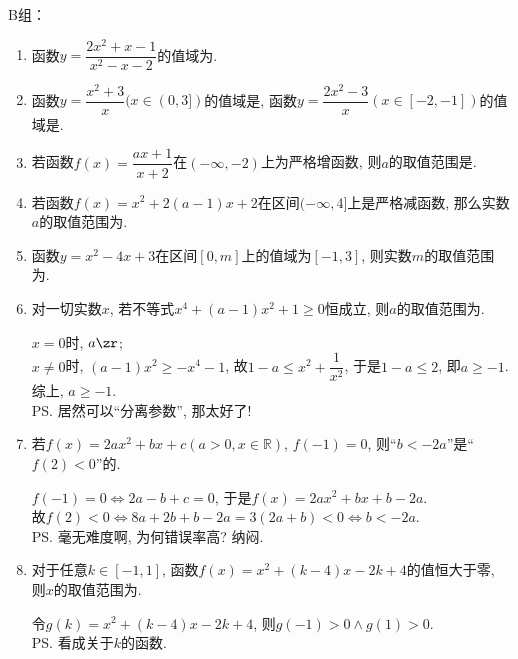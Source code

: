B组：
\begin{enumerate}
\item 函数$y=\dfrac{2x^2+x-1}{x^2-x-2}$的值域为. 

\item 函数$y=\dfrac{x^2+3}{x}(x\in (0,3] )$的值域是\blkda[1.8]{$[2\sqrt{3},+\infty)$}, 
函数$y=\dfrac{2x^2-3}{x}(x\in [-2, -1])$的值域是\blkda{$[-\frac{5}{2},1]$}. 

\item 若函数$f(x)=\dfrac{ax+1}{x+2}$在$(-\infty,-2)$上为严格增函数, 则$a$的取值范围是. 

\item 若函数$f(x)=x^2+2(a-1)x+2$在区间$(-\infty,4]$上是严格减函数, 那么实数$a$的取值范围为. 

\item 函数$y=x^2-4x+3$在区间$[0,m]$上的值域为$[-1,3]$, 则实数$m$的取值范围为\blkda{$[2,4]$}. 

\item 对一切实数$x$, 若不等式$x^4+(a-1)x^2+1\geq 0$恒成立, 则$a$的取值范围为\blkda{$[-1,+\infty)$}. 
\begin{jieda}
$x=0$时, $a\zr$; \\
$x\neq 0$时, $(a-1)x^2\geq -x^4-1$, 故$1-a\leq x^2+\dfrac{1}{x^2}$, 于是$1-a\leq 2$, 即$a\geq -1$. \\
综上, $a\geq -1$. \\
\ps 居然可以``分离参数'', 那太好了! 
\end{jieda}


\item 若$f(x)=2ax^2+bx+c(a>0,x\in \mathbb{R})$, $f(-1)=0$, 则``$b<-2a$''是``$f(2)<0$''的.
\begin{jieda}
$f(-1)=0\iff 2a-b+c=0$, 于是$f(x)=2ax^2+bx+b-2a$. \\
故$f(2)<0\iff 8a+2b+b-2a=3(2a+b)<0\iff b<-2a$. \\
\ps 毫无难度啊, 为何错误率高? 纳闷. 
\end{jieda}

\item 对于任意$k\in[-1,1]$, 函数$f(x)=x^2+(k-4)x-2k+4$的值恒大于零, 则$x$的取值范围为.
\begin{jieda}
令$g(k)=x^2+(k-4)x-2k+4$, 则$g(-1)>0\land g(1)>0$. \\
\ps 看成关于$k$的函数. 
\end{jieda}



\end{enumerate}
